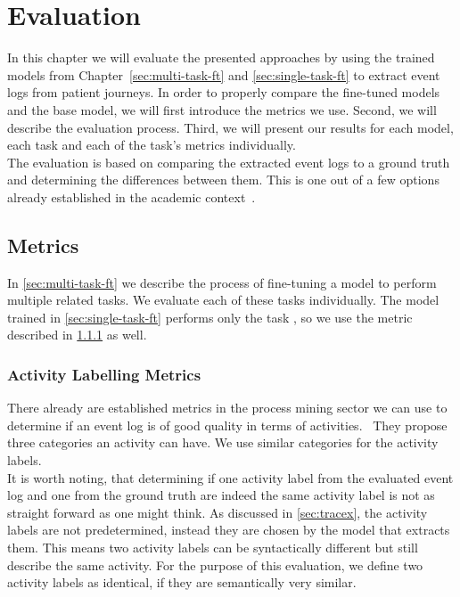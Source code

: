 \section{Evaluation}\label{sec:eval}
In this chapter we will evaluate the presented approaches by using the trained models from Chapter~\ref{sec:multi-task-ft} and \ref{sec:single-task-ft} to extract event logs from patient journeys. In order to properly compare the fine-tuned models and the base model, we will first introduce the metrics we use. Second, we will describe the evaluation process. Third, we will present our results for each model, each task and each of the task's metrics individually.\\
The evaluation is based on comparing the extracted event logs to a ground truth and determining the differences between them. This is one out of a few options already established in the academic context~\cite{latif_fine-tuning_2024}.

\subsection{Metrics}\label{sec:metrics}
In \ref{sec:multi-task-ft} we describe the process of fine-tuning a model to perform multiple related tasks. We evaluate each of these tasks individually. The model trained in \ref{sec:single-task-ft} performs only the task , so we use the metric described in \ref{sec:activity_metrics} as well.

\subsubsection{Activity Labelling Metrics}\label{sec:activity_metrics}
There already are established metrics in the process mining sector we can use to determine if an event log is of good quality in terms of activities.~\cite{van_der_aalst_process_2016, carmona_conformance_2018} They propose three categories an activity can have. We use similar categories for the activity labels.\\
It is worth noting, that determining if one activity label from the evaluated event log and one from the ground truth are indeed the same activity label is not as straight forward as one might think. As discussed in \ref{sec:tracex}, the activity labels are not predetermined, instead they are chosen by the model that extracts them. This means two activity labels can be syntactically different but still describe the same activity. For the purpose of this evaluation, we define two activity labels as identical, if they are semantically very similar.
